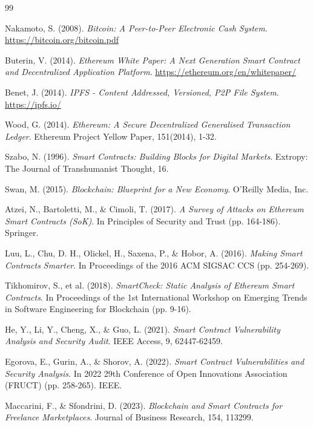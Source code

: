 \begin{thebibliography}{99}
\footnotesize
\linespread{1.0}\selectfont
\setlength{\itemsep}{1pt}
\setlength{\parsep}{0pt}
\setlength{\parskip}{0pt}

 Nakamoto, S. (2008). \textit{Bitcoin: A Peer-to-Peer Electronic Cash System}. \url{https://bitcoin.org/bitcoin.pdf}

 Buterin, V. (2014). \textit{Ethereum White Paper: A Next Generation Smart Contract and Decentralized Application Platform}. \url{https://ethereum.org/en/whitepaper/}

 Benet, J. (2014). \textit{IPFS - Content Addressed, Versioned, P2P File System}. \url{https://ipfs.io/}

 Wood, G. (2014). \textit{Ethereum: A Secure Decentralized Generalised Transaction Ledger}. Ethereum Project Yellow Paper, 151(2014), 1-32.

 Szabo, N. (1996). \textit{Smart Contracts: Building Blocks for Digital Markets}. Extropy: The Journal of Transhumanist Thought, 16.

 Swan, M. (2015). \textit{Blockchain: Blueprint for a New Economy}. O'Reilly Media, Inc.

 Atzei, N., Bartoletti, M., \& Cimoli, T. (2017). \textit{A Survey of Attacks on Ethereum Smart Contracts (SoK)}. In Principles of Security and Trust (pp. 164-186). Springer.

 Luu, L., Chu, D. H., Olickel, H., Saxena, P., \& Hobor, A. (2016). \textit{Making Smart Contracts Smarter}. In Proceedings of the 2016 ACM SIGSAC CCS (pp. 254-269).

 Tikhomirov, S., et al. (2018). \textit{SmartCheck: Static Analysis of Ethereum Smart Contracts}. In Proceedings of the 1st International Workshop on Emerging Trends in Software Engineering for Blockchain (pp. 9-16).

 He, Y., Li, Y., Cheng, X., \& Guo, L. (2021). \textit{Smart Contract Vulnerability Analysis and Security Audit}. IEEE Access, 9, 62447-62459.

 Egorova, E., Gurin, A., \& Shorov, A. (2022). \textit{Smart Contract Vulnerabilities and Security Analysis}. In 2022 29th Conference of Open Innovations Association (FRUCT) (pp. 258-265). IEEE.

 Maccarini, F., \& Sfondrini, D. (2023). \textit{Blockchain and Smart Contracts for Freelance Marketplaces}. Journal of Business Research, 154, 113299.


\end{thebibliography}
